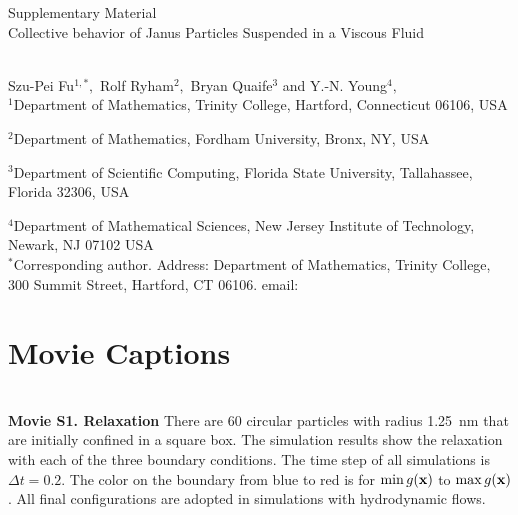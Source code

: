 
\thispagestyle{empty}

\newpage
{\Large \bf

  \noindent Supplementary Material\\

  \noindent 
  Collective behavior of Janus Particles Suspended in a Viscous Fluid}\\

\noindent 
Szu-Pei Fu$^{1,*},$ 
Rolf Ryham$^{2},$ 
Bryan Quaife$^{3}$ and Y.-N. Young$^{4},$
\\

\noindent
$^{1}$Department of Mathematics, Trinity College, Hartford, Connecticut 06106, USA

\noindent
$^{2}$Department of Mathematics, Fordham University, Bronx, NY, USA

\noindent
$^{3}$Department of Scientific Computing, Florida State University, Tallahassee, Florida 32306, USA

\noindent
$^{4}$Department of Mathematical Sciences, New Jersey Institute of Technology, Newark, NJ 07102 USA
\\

\noindent $^*$Corresponding author. Address: Department of Mathematics, Trinity College, 
300 Summit Street, Hartford, CT 06106. email: 



\setcounter{page}{1}

\setcounter{figure}{0}
\renewcommand{\thefigure}{S\arabic{figure}}

\setcounter{equation}{0}
\renewcommand{\theequation}{S\arabic{equation}}

\setcounter{section}{0}
\renewcommand{\thesection}{S\arabic{section}} 





\sloppy
\section{Movie Captions}\mbox{} \\

\noindent
{\bf Movie S1. Relaxation} 
There are 60 circular particles with radius 1.25~nm that are initially
confined in a square box. The simulation results show the relaxation
with each of the three boundary conditions. The time step of all
simulations is $\Delta t=0.2$. The color on the boundary from blue to
red is for $\min g(\mathbf{x})$ to $\max g(\mathbf{x})$. All final configurations are
adopted in simulations with hydrodynamic flows. \\


